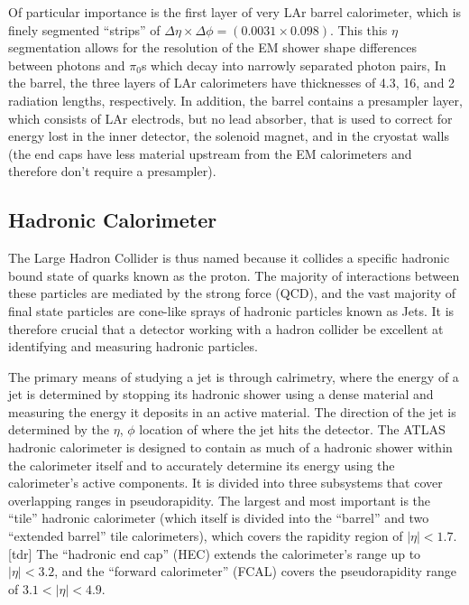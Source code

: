 Of particular importance is the first layer of very LAr barrel calorimeter, which is finely segmented ``strips'' of  $\Delta \eta \times \Delta \phi = (0.0031 \times 0.098)$. 
This this $\eta$ segmentation allows for the resolution of the EM shower shape differences between photons and $\pi_{0}$s which decay into narrowly separated photon pairs, 
In the barrel, the three layers of LAr calorimeters have thicknesses of 4.3, 16, and 2 radiation lengths, respectively.
In addition, the barrel contains a presampler layer, which consists of LAr electrods, but no lead absorber, that is used to correct for energy lost in the inner detector, the solenoid magnet, and in the cryostat walls (the end caps have less material upstream from the EM calorimeters and therefore don't require a presampler). %



\subsection{Hadronic Calorimeter}
The Large Hadron Collider is thus named because it collides a specific hadronic bound state of quarks known as the proton.
The majority of interactions between these particles are mediated by the strong force (QCD), and the vast majority of final state particles are cone-like sprays of hadronic particles known as Jets.
It is therefore crucial that a detector working with a hadron collider be excellent at identifying and measuring hadronic particles.

The primary means of studying a jet is through calrimetry, where the energy of a jet is determined by stopping its hadronic shower using a dense material and measuring the energy it deposits in an active material.
The direction of the jet is determined by the  $\eta$, $\phi$ location of where the jet hits the detector.
The ATLAS hadronic calorimeter is designed to contain as much of a hadronic shower within the calorimeter itself and to accurately determine its energy using the calorimeter's active components.
It is divided into three subsystems that cover overlapping ranges in pseudorapidity.
The largest and most important is the ``tile'' hadronic calorimeter (which itself is divided into the ``barrel'' and two ``extended barrel'' tile calorimeters), which covers the rapidity region of $|\eta| < 1.7$. [tdr]  
The ``hadronic end cap'' (HEC) extends the calorimeter's range up to $|\eta| < 3.2$, and the ``forward calorimeter'' (FCAL) covers the pseudorapidity range of $3.1 < |\eta| < 4.9$.  

